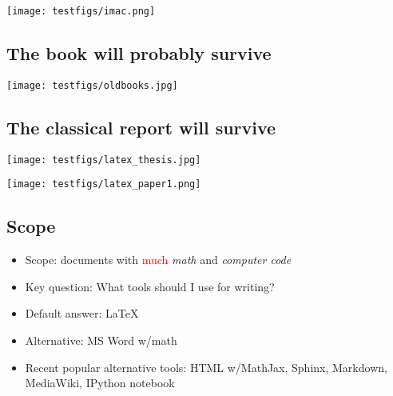 \documentclass[%
oneside,                 %
final,                   %
10pt]{article}
\begin{document}

\vspace{6mm}

\centerline{\texttt{[image: testfigs/imac.png]}}

\vspace{6mm}


\subsection{The book will probably survive}

\vspace{6mm}

\centerline{\texttt{[image: testfigs/oldbooks.jpg]}}

\vspace{6mm}

\subsection{The classical report will survive}


\vspace{6mm}

\centerline{\texttt{[image: testfigs/latex\_thesis.jpg]}}

\vspace{6mm}



\vspace{6mm}

\centerline{\texttt{[image: testfigs/latex\_paper1.png]}}

\vspace{6mm}


\subsection{Scope}


\begin{itemize}
  \item Scope: documents with \textcolor{red}{much} \emph{math} and \emph{computer code}

  \item Key question: What tools should I use for writing?

  \item Default answer: {\LaTeX}

  \item Alternative: MS Word w/math

  \item Recent popular alternative tools: HTML w/MathJax, Sphinx, Markdown, MediaWiki, IPython notebook
\end{itemize}
\end{document}
